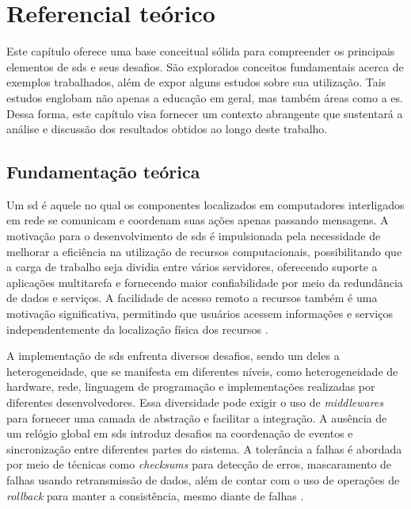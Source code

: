 
\chapter{Referencial teórico}
\label{cap:referencialTeorico}

Este capítulo oferece uma base conceitual sólida para compreender os principais elementos de \gls{sds} e seus desafios. São explorados conceitos fundamentais acerca de exemplos trabalhados, além de expor alguns estudos sobre sua utilização. Tais estudos englobam não apenas a educação em geral, mas também áreas como a \gls{es}. Dessa forma, este capítulo visa fornecer um contexto abrangente que sustentará a análise e discussão dos resultados obtidos ao longo deste trabalho.

\section{Fundamentação teórica}
\label{section:background}

Um \gls{sd} é aquele no qual os componentes localizados em computadores interligados em rede se comunicam e coordenam suas ações apenas passando mensagens. A motivação para o desenvolvimento de \gls{sds} é impulsionada pela necessidade de melhorar a eficiência na utilização de recursos computacionais, possibilitando que a carga de trabalho seja dividia entre vários servidores, oferecendo suporte a aplicações multitarefa e fornecendo maior confiabilidade por meio da redundância de dados e serviços. A facilidade de acesso remoto a recursos também é uma motivação significativa, permitindo que usuários acessem informações e serviços independentemente da localização física dos recursos \cite{TanenbaumDistributedSystemsThirdEdition}.

A implementação de \gls{sds} enfrenta diversos desafios, sendo um deles a heterogeneidade, que se manifesta em diferentes níveis, como heterogeneidade de hardware, rede, linguagem de programação e implementações realizadas por diferentes desenvolvedores. Essa diversidade pode exigir o uso de \textit{middlewares} para fornecer uma camada de abstração e facilitar a integração. A ausência de um relógio global em \gls{sds} introduz desafios na coordenação de eventos e sincronização entre diferentes partes do sistema. A tolerância a falhas é abordada por meio de técnicas como \textit{checksums} para detecção de erros, mascaramento de falhas usando retransmissão de dados, além de contar com o uso de operações de \textit{rollback} para manter a consistência, mesmo diante de falhas \cite{DistributedSystemsCoulouris}.

